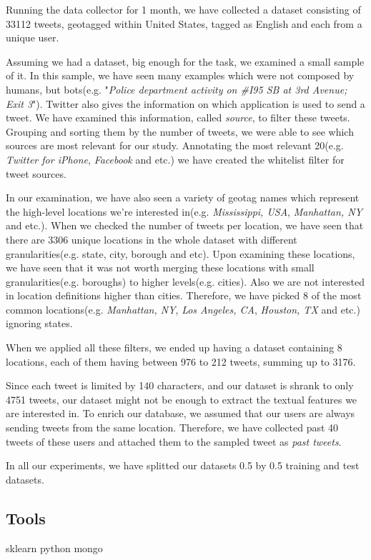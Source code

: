 \documentclass[twoside,11pt]{article}
\begin{document}
Running the data collector for 1 month, we have collected a dataset consisting of 33112 tweets, geotagged within United States, tagged as English and each from a unique user.

Assuming we had a dataset, big enough for the task, we examined a small sample of it. In this sample, we have seen many examples which were not composed by humans, but bots(e.g. "\textit{Police department activity on \#I95 SB at 3rd Avenue; Exit 3}"). Twitter also gives the information on which application is used to send a tweet. We have examined this information, called \textit{source}, to filter these tweets. Grouping and sorting them by the number of tweets, we were able to see which sources are most relevant for our study. Annotating the most relevant 20(e.g. \textit{Twitter for iPhone}, \textit{Facebook} and etc.) we have created the whitelist filter for tweet sources.

In our examination, we have also seen a variety of geotag names which represent the high-level locations we're interested in(e.g. \textit{Mississippi, USA}, \textit{Manhattan, NY} and etc.). When we checked the number of tweets per location, we have seen that there are 3306 unique locations in the whole dataset with different granularities(e.g. state, city, borough and etc). Upon examining these locations, we have seen that it was not worth merging these locations with small granularities(e.g. boroughs) to higher levels(e.g. cities). Also we are not interested in location definitions higher than cities. Therefore, we have picked 8 of the most common locations(e.g. \textit{Manhattan, NY}, \textit{Los Angeles, CA}, \textit{Houston, TX} and etc.) ignoring states. 

When we applied all these filters, we ended up having a dataset containing 8 locations, each of them having between 976 to 212 tweets, summing up to 3176.

Since each tweet is limited by 140 characters, and our dataset is shrank to only 4751 tweets, our dataset might not be enough to extract the textual features we are interested in. To enrich our database, we assumed that our users are always sending tweets from the same location. Therefore, we have collected past 40 tweets of these users and attached them to the sampled tweet as \textit{past tweets}.

In all our experiments, we have splitted our datasets 0.5 by 0.5 training and test datasets.
\subsection{Tools}
sklearn python mongo
\end{document}
